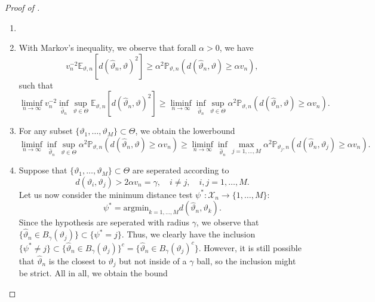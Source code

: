 \documentclass[a4paper]{article}
\begin{document}
\begin{proof}[Proof of ]
	\begin{enumerate}
		\item[]
		\item With Markov's inequality, we observe that forall $\alpha>0$, we have
		      \begin{equation*}
			      v_{n}^{-2}\mathbb{E}_{\vartheta,n}[d(\hat{\vartheta}_n, \vartheta)^{2}] \geq \alpha^{2}\mathbb{P}_{\vartheta,n}(d(\hat{\vartheta}_n, \vartheta) \geq \alpha v_n),
		      \end{equation*}
		      such that
		      \begin{equation*}
			      \liminf_{n \rightarrow \infty} v_n^{-2} \inf_{\hat{\vartheta}_n} \sup_{\vartheta \in \Theta} \mathbb{E}_{\vartheta,n}[d(\hat{\vartheta}_{n}, \vartheta)^{2}] \geq \liminf_{n \rightarrow \infty} \inf_{\hat{\vartheta}_n} \sup_{\vartheta \in \Theta} \alpha^{2}\mathbb{P}_{\vartheta,n}(d(\hat{\vartheta}_n, \vartheta) \geq \alpha v_n).
		      \end{equation*}
		\item For any subset $\{\vartheta_1, \dots, \vartheta_M\} \subset \Theta$, we obtain the lowerbound
		      \begin{equation*}
			      \liminf_{n \rightarrow \infty} \inf_{\hat{\vartheta}_n} \sup_{\vartheta \in \Theta} \alpha^{2}\mathbb{P}_{\vartheta,n}(d(\hat{\vartheta}_n, \vartheta) \geq \alpha v_n) \geq \liminf_{n \rightarrow \infty} \inf_{\hat{\vartheta}_n} \max_{j=1,\dots,M} \alpha^{2}\mathbb{P}_{\vartheta_j,n}(d(\hat{\vartheta}_n, \vartheta_j) \geq \alpha v_n).
		      \end{equation*}
		\item Suppose that $\{\vartheta_1, \dots, \vartheta_M\} \subset \Theta$ are seperated according to
		      \begin{equation}
                    \label{eq:seperation_condition}
			      d(\vartheta_i, \vartheta_j)> 2 \alpha v_n = \gamma, \quad i \neq j, \quad i,j=1, \dots, M.
		      \end{equation}
		      Let us now consider the minimum distance test $\psi^{*}:\mathcal{X}_n \rightarrow \{1, \dots,M\}$:
		      \begin{equation*}
			      \psi^{*}=\mathrm{argmin}_{k=1, \dots, M} d(\hat{\vartheta}_n, \vartheta_k).
		      \end{equation*}
		      Since the hypothesis are seperated with radius $\gamma$, we observe that $\{\hat{\vartheta}_n \in B_{\gamma}(\vartheta_j)\} \subset\{\psi^{*} = j\}$. Thus, we clearly have the inclusion $\{\psi^{*} \neq j\}  \subset \{ \hat{\vartheta}_n  \in B_{\gamma}(\vartheta_j)\}^{c}=\{\hat{\vartheta}_n \in B_{\gamma}(\vartheta_j)^{c}\}$. However, it is still possible that $\hat{\vartheta}_n$ is the closest to $\vartheta_j$ but not inside of a $\gamma$ ball, so the inclusion might be strict. All in all, we obtain the bound

\end{enumerate}
\end{proof}
\end{document}
